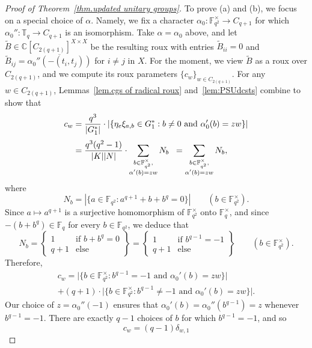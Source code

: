 \begin{proof}[Proof of Theorem~\ref{thm.updated unitary groups}]
To prove (a) and (b), we focus on a special choice of $\alpha$.
Namely, we fix a character $\alpha_0 \colon \mathbb{F}_{q^2}^\times \to C_{q+1}$ for which $\alpha_0'' \colon \mathbb{T}_q \to C_{q+1}$ is an isomorphism.
Take $\alpha = \alpha_0$ above, and let $\tilde{B}\in \mathbb{C}[C_{2(q+1)}]^{X \times X}$ be the resulting roux with entries $\tilde{B}_{ii} = 0$ and $\tilde{B}_{ij} =  \overline{\alpha_0''(-(t_i,t_j))}$ for $i \neq j$ in $X$.
For the moment, we view $\tilde{B}$ as a roux over $C_{2(q+1)}$, and we compute its roux parameters $\{c_w\}_{w\in C_{2(q+1)}}$.
For any $w \in C_{2(q+1)}$, Lemmas~\ref{lem.cgs of radical roux} and~\ref{lem:PSUdcsts}
combine to show that 
\begin{align}
\label{eq:PSUcw}
c_w &= \frac{q^3}{|G_1^*|}\cdot  \left| \{ \eta_e \xi_{a,b} \in G_1^* : b\neq 0 \text{ and } \alpha_0'(b) = z w \} \right| \\[3 pt] \notag
&= \frac{q^3(q^2 - 1)}{|K||N|}\cdot \sum_{ \substack{ b \in \mathbb{F}_{q^2}^\times, \\ \alpha'(b) = z w }} N_b
\;\; = \sum_{ \substack{ b \in \mathbb{F}_{q^2}^\times, \\ \alpha'(b) = z w }} N_b,
\end{align}
where 
\[ N_b
=
| \{ a \in \mathbb{F}_{q^2} : a^{q+1} + b + b^q = 0 \} |
\qquad
(b \in \mathbb{F}_{q^2}^\times).
\]
Since $a\mapsto a^{q+1}$ is a surjective homomorphism of $\mathbb{F}_{q^2}^\times$ onto $\mathbb{F}_q^\times$, and since $-(b+b^q)\in\mathbb{F}_q$ for every $b\in\mathbb{F}_{q^2}$, we deduce that
\[
N_b
=\left\{\begin{array}{cl}
1&\text{if }b+b^q=0 \\
q+1&\text{else}
\end{array}\right\}
=\left\{\begin{array}{cl}
1&\text{if }b^{q-1}=-1 \\
q+1&\text{else}
\end{array}\right\}
\qquad
(b \in \mathbb{F}_{q^2}^\times).
\] 
Therefore,
\begin{multline*}
c_w
=\Big|\Big\{b\in\mathbb{F}_{q^2}^\times:b^{q-1}=-1\text{ and }\alpha_0'(b)=zw\Big\}\Big| \\
+(q+1) \cdot \Big|\Big\{b\in\mathbb{F}_{q^2}^\times:b^{q-1}\neq-1\text{ and }\alpha_0'(b)=zw\Big\}\Big|.
\end{multline*}
Our choice of $z=\alpha_0''(-1)$ ensures that $\alpha_0'(b)=\alpha_0''(b^{q-1})=z$ whenever $b^{q-1}=-1$.
There are exactly $q-1$ choices of $b$ for which $b^{q-1}=-1$, and so 
\[
c_w
=(q-1)\delta_{w,1}
\]
\end{proof}
